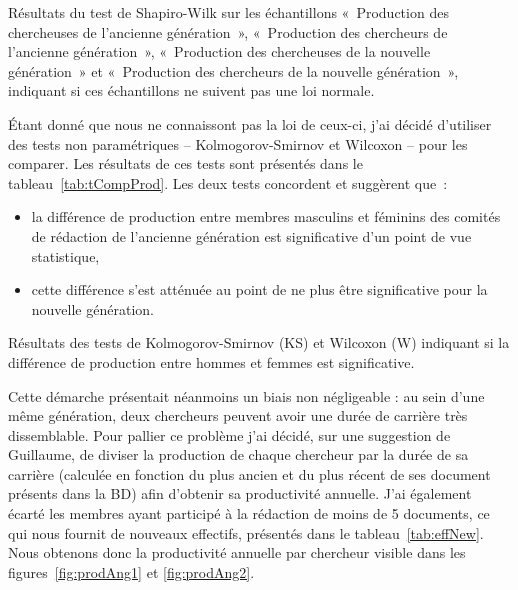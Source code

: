 			\begin{table}[ht]
				\centering
				\caption{Résultats du test de Shapiro-Wilk sur les échantillons «~Production des chercheuses de l'ancienne génération~», «~Production des chercheurs de l'ancienne génération~», «~Production des chercheuses de la nouvelle génération~» et «~Production des chercheurs de la nouvelle génération~», indiquant si ces échantillons ne suivent pas une loi normale.}\label{tab:testsNorm}
				
			\end{table}
			
			Étant donné que nous ne connaissont pas la loi de ceux-ci, j'ai décidé d'utiliser des tests non paramétriques -- Kolmogorov-Smirnov et Wilcoxon -- pour les comparer. Les résultats de ces tests sont présentés dans le tableau~\ref{tab:tCompProd}. Les deux tests concordent et suggèrent que~:
			\begin{itemize}
				\item la différence de production entre membres masculins et féminins des comités de rédaction de l'ancienne génération est significative d'un point de vue statistique,
				\item cette différence s'est atténuée au point de ne plus être significative pour la nouvelle génération.
			\end{itemize}
			
			\begin{table}[h]
				\centering
				\caption{Résultats des tests de Kolmogorov-Smirnov (KS) et Wilcoxon (W) indiquant si la différence de production entre hommes et femmes est significative.}\label{tab:tCompProd}
				
			\end{table}
			
			
			Cette démarche présentait néanmoins un biais non négligeable : au sein d’une même génération, deux chercheurs peuvent avoir une durée de carrière très dissemblable. Pour pallier ce problème j’ai décidé, sur une suggestion de Guillaume, de diviser la production
de chaque chercheur par la durée de sa carrière (calculée en fonction du plus ancien et du plus récent de ses document présents dans la BD) afin d'obtenir sa productivité annuelle. J’ai également écarté les membres ayant participé à la rédaction de moins de 5 documents, ce qui nous fournit de nouveaux effectifs, présentés dans le tableau~\ref{tab:effNew}. Nous obtenons donc la productivité annuelle par chercheur visible dans les figures~\ref{fig:prodAng1} et \ref{fig:prodAng2}.
		
